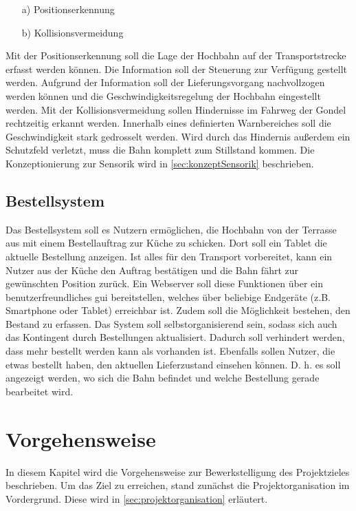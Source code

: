 \begin{itemize}
	\item [a)] Positionserkennung 
	\item [b)] Kollisionsvermeidung  
	
\end{itemize}

Mit der Positionserkennung soll die Lage der Hochbahn auf der Transportstrecke erfasst werden können. Die Information soll der Steuerung zur Verfügung gestellt werden. Aufgrund der Information soll der Lieferungsvorgang nachvollzogen werden können und die Geschwindigkeitsregelung der Hochbahn eingestellt werden. Mit der Kollisionsvermeidung sollen Hindernisse im Fahrweg der Gondel rechtzeitig erkannt werden. Innerhalb eines definierten Warnbereiches soll die Geschwindigkeit stark gedrosselt werden. Wird durch das Hindernis außerdem ein Schutzfeld verletzt, muss die Bahn komplett zum Stillstand kommen. Die Konzeptionierung zur Sensorik wird in \autoref{sec:konzeptSensorik} beschrieben.
\newpage


\section{Bestellsystem}
\label{sec:anforderungBestellstystem}

Das Bestellsystem soll es Nutzern ermöglichen, die Hochbahn von der Terrasse aus mit einem Bestellauftrag zur Küche zu schicken. 
Dort soll ein Tablet die aktuelle Bestellung anzeigen. Ist alles für den Transport vorbereitet, kann ein Nutzer aus der Küche den Auftrag 
bestätigen und die Bahn fährt zur gewünschten Position zurück. Ein Webserver soll diese Funktionen über ein benutzerfreundliches \acrfull{gui} bereitstellen, welches über beliebige Endgeräte (z.B. Smartphone oder Tablet) erreichbar ist.
Zudem soll die Möglichkeit bestehen, den Bestand zu erfassen. Das System soll selbstorganisierend sein, sodass sich auch das Kontingent durch Bestellungen aktualisiert. Dadurch soll verhindert werden, dass mehr bestellt werden kann als vorhanden ist.
Ebenfalls sollen Nutzer, die etwas bestellt haben, den aktuellen Lieferzustand einsehen können. D. h. es soll angezeigt werden, wo sich die Bahn befindet und welche Bestellung gerade bearbeitet wird.


\chapter{Vorgehensweise}
\label{cha:vorgehensweise}
In diesem Kapitel wird die Vorgehensweise zur Bewerkstelligung des Projektzieles beschrieben. Um das Ziel zu erreichen, stand zunächst die Projektorganisation im Vordergrund. Diese wird in \autoref{sec:projektorganisation} erläutert. 

